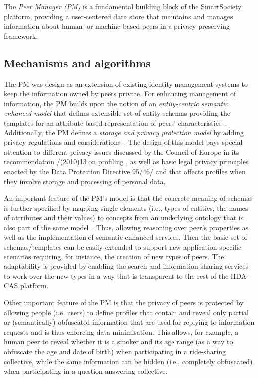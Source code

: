 
The \emph{Peer Manager (PM)} is a fundamental building block of the SmartSociety platform, providing a user-centered data store that maintains and manages information about human- or machine-based peers in a privacy-preserving framework. 

\subsection{Mechanisms and algorithms}

The PM was design as an extension of existing identity management systems to keep the information owned by peers private.
For enhancing management of information, the PM builds upon the notion of an \emph{entity-centric semantic enhanced model} that defines extensible set of entity schemas providing the templates for an attribute-based representation of peers' characteristics~\cite{Giunchiglia_fromknowledge}. Additionally, the PM defines a \emph{storage and privacy protection model} by adding privacy regulations and considerations~\cite{Hartswood:2015fe}. 
The design of this model pays special attention to different privacy issues discussed by the Council of Europe in its recommendation {}/{}(2010)13 on profiling \cite{CoE2010}, as well as 
basic legal privacy principles enacted by the {} Data Protection Directive 95/46/{} \cite{EUDir95} and that affects profiles when they involve storage and processing of personal data.

An important feature of the PM's model is that the concrete meaning of schemas is further specified by mapping single elements (i.e., types of entities, the names of attributes and their values) to concepts from an underlying ontology that is also part of the same model~\cite{Giunchiglia_fromknowledge}. Thus, allowing reasoning over peer's properties as well as the implementation of semantic-enhanced services.
%
Then the basic set of schemas/templates can be easily extended to support new application-specific scenarios requiring, for instance, the creation of new types of peers. The adaptability is provided by enabling the search and information sharing services to work over the new types in a way that is transparent to the rest of the HDA-CAS platform.

Other important feature of the PM is that the privacy of peers is protected by allowing people (i.e. users) to define profiles that contain and reveal only partial or (semantically) obfuscated information that are used for replying to information requests and is thus enforcing data minimisation. 
This allows, for example, a human peer to reveal whether it is a smoker and its age range (as a way to obfuscate the age and date of birth) when participating in a ride-sharing collective, while the same information can be hidden (i.e., completely obfuscated) when participating in a question-answering collective.

